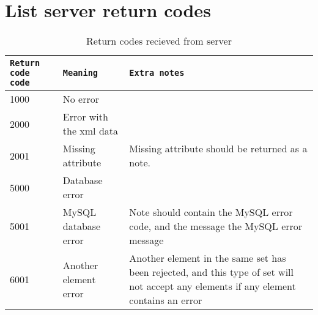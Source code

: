 \newpage
\section{List server return codes}

\begin{table}[h]
    \centering
    \caption{Return codes recieved from server}
    \begin{tabular}{|l|l|p{5cm}|}
        \hline
        \texttt{Return code code} & \texttt{Meaning} & \texttt{Extra notes} \\
        \hline
        \hline
        1000 & No error & \\
        \hline
        \hline
        2000 & Error with the \gls{xml} data & \\
        \hline
        2001 & Missing attribute & Missing attribute should be returned as a note. \\
        \hline
        \hline
        5000 & Database error & \\
        \hline
        5001 & MySQL database error & Note should contain the MySQL error code, 
        and the message the MySQL error message \\
        \hline
        \hline
        6001 & Another element error & Another element in the same set has been
        rejected, and this type of set will not accept any elements if any
        element contains an error\\
        \hline
    \end{tabular}
    \label{tbl:server_error_codes}
\end{table}
